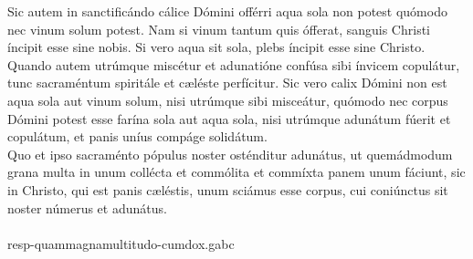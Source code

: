 \documentclass[options]{article}
\begin{document}
	Sic autem in sanctificándo cálice Dómini offérri aqua sola non potest quómodo nec vinum solum potest. Nam si vinum tantum quis ófferat, sanguis Christi íncipit esse sine nobis. Si vero aqua sit sola, plebs íncipit esse sine Christo. Quando autem utrúmque miscétur et adunatióne confúsa sibi ínvicem copulátur, tunc sacraméntum spiritále et cæléste perfícitur. Sic vero calix Dómini non est aqua sola aut vinum solum, nisi utrúmque sibi misceátur, quómodo nec corpus Dómini potest esse farína sola aut aqua sola, nisi utrúmque adunátum fúerit et copulátum, et panis uníus compáge solidátum.\\
	
	Quo et ipso sacraménto pópulus noster osténditur adunátus, ut quemádmodum grana multa in unum collécta et commólita et commíxta panem unum fáciunt, sic in Christo, qui est panis cæléstis, unum sciámus esse corpus, cui coniúnctus sit noster númerus et adunátus.\\
	\\
	resp-quammagnamultitudo-cumdox.gabc
\end{document}
